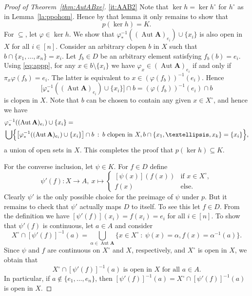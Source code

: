 \documentclass[12pt,a4paper,reqno]{amsart}
\numberwithin{equation}{section}
\theoremstyle{plain}
\theoremstyle{definition}
\newcommand{\A}{\mathbf{A}}
\DeclareMathOperator{\Aut}{Aut}
\newcommand{\st}{\: :\:}
\begin{document}
\begin{proof}[Proof of Theorem~\ref{thm:AutABxe}]
 \eqref{it:AAB2}
 Note that $\ker h = \ker h^\circ$ for $h^\circ$ as in Lemma~\ref{la:ppohom}.
 Hence by that lemma it only remains to show that
\begin{equation} \label{eq:pkh}
  p(\ker h) = K.
\end{equation}  
 For $\subseteq$, let $\varphi\in\ker h$.
 We show that $\varphi_*^{-1}((\Aut\A)_{e_i}) \cup \{x_i\}$ is also open in $X$ for all $i\in [n]$.
 Consider an arbitrary clopen $b$ in $X$ such that $b\cap \{x_1,\dots,x_n \} = x_i$.
Let  $f_{b}\in D$ be an arbitrary element satisfying $f_{b}(b) = e_i$.
Using \eqref{eq:appp}, for any $x\in b\setminus \{x_i\}$ we have $\varphi_x\in(\Aut\A)_{e_i}$ if and only if
$\pi_x\varphi(f_b) = e_i$. The latter is equivalent to $x\in (\varphi(f_b))^{-1}(e_i)$.
 Hence
\[ \bigl[\varphi_*^{-1}((\Aut\A)_{e_i})\cup \{x_i\}\bigr] \cap b = (\varphi(f_b))^{-1}(e_i) \cap b\]
 is clopen in $X$. 
 Note that $b$ can be chosen to contain any given $x\in X^\circ$, and hence we have
\begin{align*}
   & \varphi_*^{-1}((\Aut\A)_{e_i}) \cup \{x_i\} =  \\
   & \bigcup\Bigl\{ \bigl[\varphi_*^{-1}((\Aut\A)_{e_i}) \cup \{x_i\}\bigr] \cap b \st b \text{ clopen in } X,
   b\cap \{x_1,\dots,x_k \} = \{x_i\} \Bigr\},
\end{align*}
 a union of open sets in $X$.  
 This completes the proof that ${p(\ker h)\subseteq K}$.
 
 For the converse inclusion, let $\psi\in K$.
 For $f\in D$ define
\[ \psi'(f)\colon X \to A,\ x\mapsto \begin{cases} [\psi(x)](f(x)) & \text{if } x\in X^\circ, \\ f(x) & \text{else}. \end{cases} \]
 Clearly $\psi'$ is the only possible choice for the preimage of $\psi$ under $p$.
 But it remains to check that $\psi'$ actually maps $D$ to itself.
 To see this let $f\in D$. From the definition we have $[\psi'(f)](x_i) = f(x_i) = e_i$ for all $i\in [n]$.  
 To show that $\psi'(f)$ is continuous, let $a\in A$ and consider
\[ X^\circ \cap [\psi'(f)]^{-1}(a) = \bigcup_{\alpha\in\Aut\A} \{ x\in X^\circ \st \psi(x) = \alpha, f(x) = \alpha^{-1}(a) \}. \]
 Since $\psi$ and $f$ are continuous on $X^\circ$ and $X$, respectively, and $X^\circ$ is open in $X$,
 we obtain that
\begin{equation} \label{eq:psi'}
 X^\circ \cap [\psi'(f)]^{-1}(a) \text{ is open in } X \text{ for all } a\in A.
\end{equation}
 In particular, if $a\not\in\{e_1,\dots,e_n\}$, then $[\psi'(f)]^{-1}(a) = X^\circ \cap [\psi'(f)]^{-1}(a)$ is open in $X$.


\end{proof}
\end{document}
